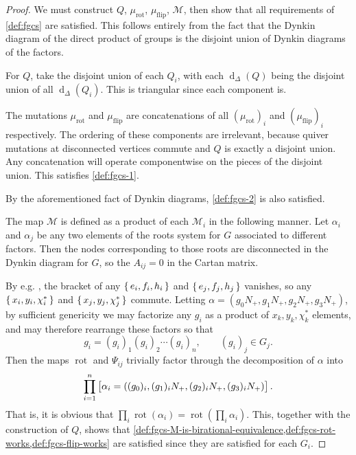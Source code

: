 \documentclass{amsart}
\theoremstyle{plain}
\theoremstyle{definition}
\theoremstyle{remark}
\newcommand{\conftoquiv}{\mathcal{M}}
\newcommand{\torush}{\chi^{\ast}}
\newcommand{\muflip}{{\mu_{\text{flip}}}}
\newcommand{\murot}{{\mu_{\text{rot}}}}
\DeclareMathOperator{\facemap}{d}
\begin{document}
  \begin{proof}
    We must construct $Q$, $\murot$, $\muflip$, $\conftoquiv$, then show
    that all requirements of \cref{def:fgcs} are satisfied. This follows
    entirely from the fact that the Dynkin diagram of the direct product
    of groups is the disjoint union of Dynkin diagrams of the factors.

    For $Q$, take the disjoint union of each $Q_i$, with each
    $\facemap_{\Delta}(Q)$ being the disjoint union of all
    $\facemap_{\Delta}(Q_i)$. This is triangular since each component
    is.

    The mutations $\murot$ and $\muflip$ are concatenations of all
    $(\murot)_i$ and $(\muflip)_i$ respectively. The ordering of these
    components are irrelevant, because quiver mutations at disconnected
    vertices commute and $Q$ is exactly a disjoint union. Any
    concatenation will operate componentwise on the pieces of the
    disjoint union. This satisfies \cref{def:fgcs-1}.

    By the aforementioned fact of Dynkin diagrams, \cref{def:fgcs-2} is
    also satisfied.

    The map $\conftoquiv$ is defined as a product of each
    $\conftoquiv_i$ in the following manner. Let $\alpha_i$ and
    $\alpha_j$ be any two elements of the roots system for $G$
    associated to different factors. Then the nodes corresponding to
    those roots are disconnected in the Dynkin diagram for $G$, so the
    $A_{ij} = 0$ in the Cartan matrix.

    By e.g. \cite[Proposition~2.95]{knapp1996}, the bracket of any
    $\set{e_i, f_i, h_i}$ and $\set{e_j, f_j, h_j}$ vanishes, so any
    $\set{x_i, y_i, \torush_i}$ and $\set{x_j, y_j, \torush_j}$ commute.
    Letting $\alpha = (g_0 N_{+}, g_1 N_{+}, g_2 N_{+}, g_3 N_{+})$, by
    sufficient genericity we may factorize any $g_i$ as a product of
    $x_k, y_k, \torush_k$ elements, and may therefore rearrange these
    factors so that \[ g_i = (g_i)_1 (g_i)_2 \dotsb (g_i)_n, \qquad
      (g_i)_j \in G_j. \] Then the maps $\operatorname{rot}$ and
    $\Psi_{ij}$ trivially factor through the decomposition of $\alpha$
    into \[ \prod_{i = 1}^{n} \left[ \strut \alpha_i = ((g_0)_i, (g_1)_i
      N_{+}, (g_2)_i N_{+}, (g_3)_i N_{+}) \right]. \] That is, it is
    obvious that $\prod_i \operatorname{rot}(\alpha_i) =
    \operatorname{rot}(\prod_i \alpha_i)$. This, together with the
    construction of $Q$, shows that \cref{def:fgcs-M-is-birational-equivalence,def:fgcs-rot-works,def:fgcs-flip-works}
    are satisfied since they are satisfied for each $G_i$.
  \end{proof}
\end{document}
